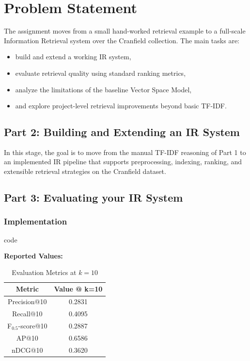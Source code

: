 \section{Problem Statement}\label{sec:prob_stat}

The assignment moves from a small hand-worked retrieval example to a full-scale Information Retrieval system over the Cranfield collection. The main tasks are:
\begin{itemize}
    \item build and extend a working IR system,
    \item evaluate retrieval quality using standard ranking metrics,
    \item analyze the limitations of the baseline Vector Space Model,
    \item and explore project-level retrieval improvements beyond basic TF-IDF.
\end{itemize}

\subsection{Part 2: Building and Extending an IR System}
In this stage, the goal is to move from the manual TF-IDF reasoning of Part 1 to an implemented IR pipeline that supports preprocessing, indexing, ranking, and extensible retrieval strategies on the Cranfield dataset.

\subsection{Part 3: Evaluating your IR System}

\subsubsection{Implementation}
code

\textbf{Reported Values:}
\begin{table}[H]
\centering
\begin{tabular}{|c|c|}
\hline
\textbf{Metric} & \textbf{Value @ k=10} \\
\hline
Precision@10 & 0.2831 \\
Recall@10 & 0.4095 \\
F$_{0.5}$-score@10 & 0.2887 \\
AP@10 & 0.6586 \\
nDCG@10 & 0.3620 \\
\hline
\end{tabular}
\caption{Evaluation Metrics at $k=10$}
\end{table}

